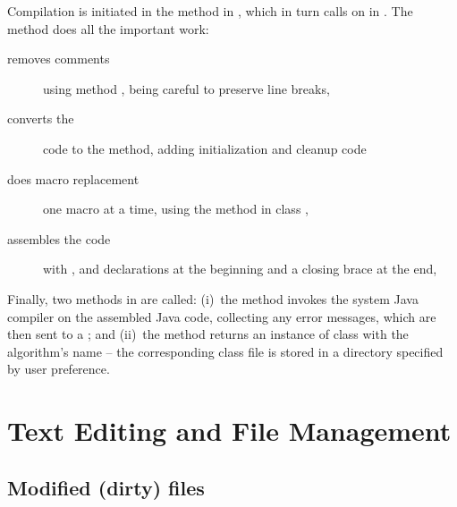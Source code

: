 Compilation is initiated in the  method in
, which in turn calls on  in
.
The method  does all the important work:
\begin{description}
\item[removes comments] using method , being careful
  to preserve line breaks,
\item[converts the ] code to the 
  method, adding initialization and cleanup code
\item[does macro replacement] one macro at a time, using the 
  method in class ,
\item[assembles the code] with ,  and 
  declarations at the beginning and a closing brace at the end,
\end{description}
Finally, two methods in  are called: (i)~the
 method invokes the system Java compiler on
the assembled Java code, collecting any error messages, which are then sent
to a ; and (ii)~the  method
returns an instance of class  with the algorithm's name --
the corresponding class file is stored in a directory specified by user
preference.


\section{Text Editing and File Management} \label{sec:editing}

\subsection{Modified (dirty) files}

